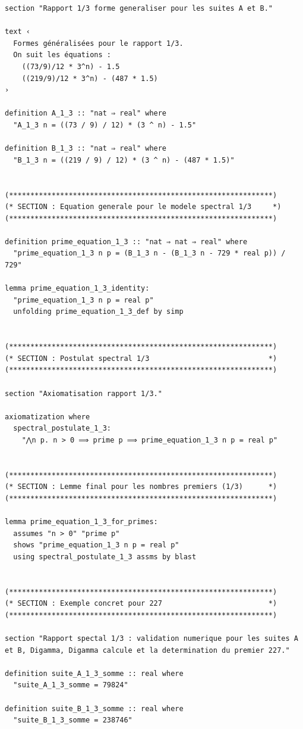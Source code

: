 \documentclass[a4paper,11pt]{article}
\begin{document}
\begin{holcode}[title={\textcolor{white}{File: methode\_spectral.thy -- Part 1/4}}]
\begin{lstlisting}
section "Rapport 1/3 forme generaliser pour les suites A et B."

text ‹
  Formes généralisées pour le rapport 1/3.
  On suit les équations :
    ((73/9)/12 * 3^n) - 1.5
    ((219/9)/12 * 3^n) - (487 * 1.5)
›

definition A_1_3 :: "nat ⇒ real" where
  "A_1_3 n = ((73 / 9) / 12) * (3 ^ n) - 1.5"

definition B_1_3 :: "nat ⇒ real" where
  "B_1_3 n = ((219 / 9) / 12) * (3 ^ n) - (487 * 1.5)"


(**************************************************************)
(* SECTION : Equation generale pour le modele spectral 1/3     *)
(**************************************************************)

definition prime_equation_1_3 :: "nat ⇒ nat ⇒ real" where
  "prime_equation_1_3 n p = (B_1_3 n - (B_1_3 n - 729 * real p)) / 729"

lemma prime_equation_1_3_identity:
  "prime_equation_1_3 n p = real p"
  unfolding prime_equation_1_3_def by simp


(**************************************************************)
(* SECTION : Postulat spectral 1/3                            *)
(**************************************************************)

section "Axiomatisation rapport 1/3."

axiomatization where
  spectral_postulate_1_3:
    "⋀n p. n > 0 ⟹ prime p ⟹ prime_equation_1_3 n p = real p"


(**************************************************************)
(* SECTION : Lemme final pour les nombres premiers (1/3)      *)
(**************************************************************)

lemma prime_equation_1_3_for_primes:
  assumes "n > 0" "prime p"
  shows "prime_equation_1_3 n p = real p"
  using spectral_postulate_1_3 assms by blast


(**************************************************************)
(* SECTION : Exemple concret pour 227                         *)
(**************************************************************)

section "Rapport spectal 1/3 : validation numerique pour les suites A et B, Digamma, Digamma calcule et la determination du premier 227."

definition suite_A_1_3_somme :: real where
  "suite_A_1_3_somme = 79824"

definition suite_B_1_3_somme :: real where
  "suite_B_1_3_somme = 238746"


\end{lstlisting}
\end{holcode}
\end{document}
